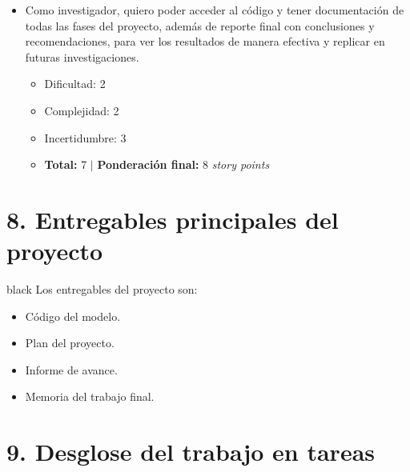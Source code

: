 \documentclass[
11pt, %
]{charter}
\begin{document}
\begin{itemize}
	\item Como investigador, quiero poder acceder al código y tener documentación de todas las fases del proyecto, además de reporte final con conclusiones y recomendaciones, para ver los resultados de manera efectiva y replicar en futuras investigaciones.
	\begin{itemize}
		\item Dificultad: 	2
		\item Complejidad: 	2
		\item Incertidumbre: 3
		\item \textbf{Total:} 7 $|$ \textbf{Ponderación final:} 8 \textit{story points}
	\end{itemize}
\end{itemize}







\section{8. Entregables principales del proyecto}
\label{sec:entregables}

\begin{consigna}{black}
Los entregables del proyecto son:

\begin{itemize}
	\item Código del modelo.
	\item Plan del proyecto.
	\item Informe de avance. 
	\item Memoria del trabajo final.
\end{itemize}
\end{consigna}

\section{9. Desglose del trabajo en tareas}
\label{sec:wbs}
\end{document}
